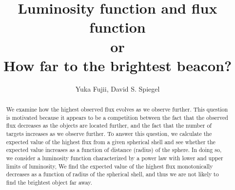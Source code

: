 \documentclass[iop,numberedappendix,apj,twocolappendix,]{emulateapj}
\begin{document}
\renewcommand\bottomfraction{.9}
\newcommand{\PD}[2]{\frac{\partial {#1}}{\partial {#2}}}
\newcommand{\memoYF}[1]{\color{red} #1 \color{black}}

\title{Luminosity function and flux function\\
or\\
How far to the brightest beacon?}
\author{%
Yuka Fujii, %
David S. Spiegel%
}


  



\begin{abstract}
We examine how the highest observed flux evolves as we observe further. 
This question is motivated because it appears to be a competition between the fact that the observed flux decreases as the objects are located further, and the fact that the number of targets increases as we observe further. 
%
To answer this question, we calculate the expected value of the highest flux from a given spherical shell and see whether the expected value increases as a function of distance (radius) of the sphere. 
In doing so, we consider  a luminosity function characterized by a power law with lower and upper limits of luminosity, %
We find the expected value of the highest flux monotonically decreases as a function of radius of the spherical shell, and thus we are not likely to find the brightest object far away. 
\end{abstract} 


\end{document}
